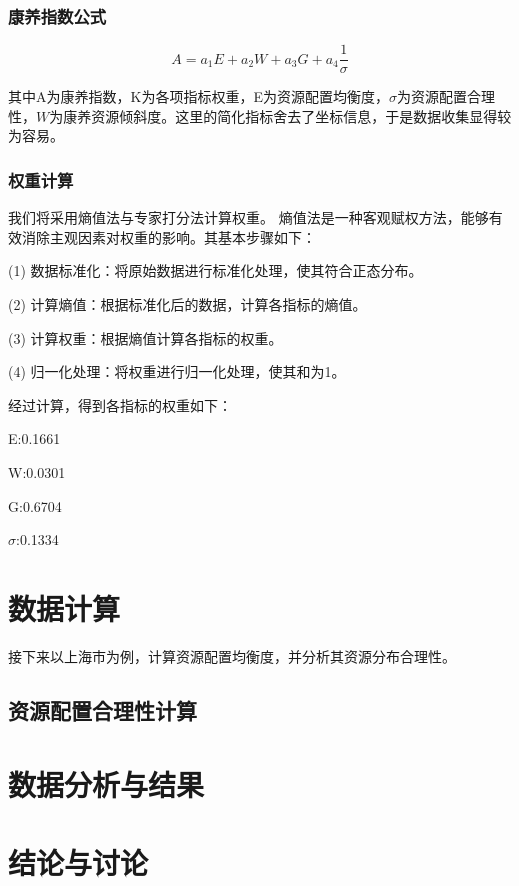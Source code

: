 \documentclass[12pt,a4paper]{article}
\begin{document}
\begin{multicols}{2}
\subsubsection{康养指数公式}

\[
A = a_1E + a_2W + a_3G + a_4\frac{1}{\sigma}
\]

其中A为康养指数，K为各项指标权重，E为资源配置均衡度，$\sigma$为资源配置合理性，$W$为康养资源倾斜度。这里的简化指标舍去了坐标信息，于是数据收集显得较为容易。

\subsubsection{权重计算}

我们将采用熵值法\cite{02}与专家打分法计算权重。
熵值法是一种客观赋权方法，能够有效消除主观因素对权重的影响。其基本步骤如下：

(1) 数据标准化：将原始数据进行标准化处理，使其符合正态分布。

(2) 计算熵值：根据标准化后的数据，计算各指标的熵值。

(3) 计算权重：根据熵值计算各指标的权重。

(4) 归一化处理：将权重进行归一化处理，使其和为1。

经过计算，得到各指标的权重如下：

E:0.1661

W:0.0301

G:0.6704

$\sigma$:0.1334

\section{数据计算}

接下来以上海市为例，计算资源配置均衡度，并分析其资源分布合理性。
\subsection{资源配置合理性计算}



\section{数据分析与结果}

\section{结论与讨论}

\end{multicols}
\newpage
\end{document}
